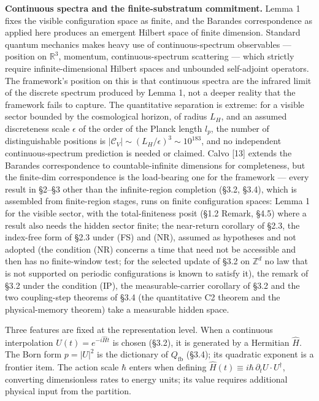 \documentclass[
]{article}
\begin{document}
\textbf{Continuous spectra and the finite-substratum commitment.} Lemma
1 fixes the visible configuration space as finite, and the Barandes
correspondence as applied here produces an emergent Hilbert space of
finite dimension. Standard quantum mechanics makes heavy use of
continuous-spectrum observables --- position on \(\mathbb{R}^3\),
momentum, continuous-spectrum scattering --- which strictly require
infinite-dimensional Hilbert spaces and unbounded self-adjoint
operators. The framework's position on this is that continuous spectra
are the infrared limit of the discrete spectrum produced by Lemma 1, not
a deeper reality that the framework fails to capture. The quantitative
separation is extreme: for a visible sector bounded by the cosmological
horizon, of radius \(L_H\), and an assumed discreteness scale
\(\epsilon\) of the order of the Planck length \(l_p\), the number of
distinguishable positions is
\(|\mathcal{C}_V| \sim (L_H/\epsilon)^3 \sim 10^{183}\), and no
independent continuous-spectrum prediction is needed or claimed. Calvo
{[}13{]} extends the Barandes correspondence to countable-infinite
dimensions for completeness, but the finite-dim correspondence is the
load-bearing one for the framework --- every result in §2--§3 other than
the infinite-region completion (§3.2, §3.4), which is assembled from
finite-region stages, runs on finite configuration spaces: Lemma 1 for
the visible sector, with the total-finiteness posit (§1.2 Remark, §4.5)
where a result also needs the hidden sector finite; the near-return
corollary of §2.3, the index-free form of §2.3 under (FS) and (NR),
assumed as hypotheses and not adopted (the condition (NR) concerns a
time that need not be accessible and then has no finite-window test; for
the selected update of §3.2 on \(\mathbb{Z}^d\) no law that is not
supported on periodic configurations is known to satisfy it), the remark
of §3.2 under the condition (IP), the measurable-carrier corollary of
§3.2 and the two coupling-step theorems of §3.4 (the quantitative C2
theorem and the physical-memory theorem) take a measurable hidden space.

Three features are fixed at the representation level. When a continuous
interpolation \(U(t) = e^{-i\hat{H}t}\) is chosen (§3.2), it is
generated by a Hermitian \(\hat{H}\). The Born form \(p = |U|^2\) is the
dictionary of \(Q_{\mathrm{fb}}\) (§3.4); its quadratic exponent is a
frontier item. The action scale \(\hbar\) enters when defining
\(\hat{H}(t) \equiv i\hbar \, \partial_t U \cdot U^\dagger\), converting
dimensionless rates to energy units; its value requires additional
physical input from the partition.
\end{document}
